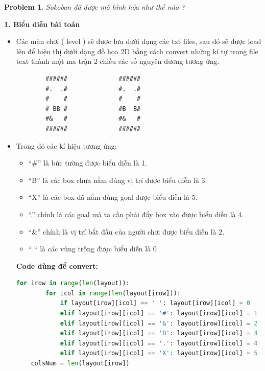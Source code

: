 \documentclass[12pt]{article}
\newtheorem{problem}{Problem}
\begin{document}
\begin{problem}
	Sokoban đã được mô hình hóa như thế nào ?
\end{problem}
\hspace{-1em}\textbf{1. Biểu diễn bài toán} 
\begin{itemize}
	\item Các màn chơi ( level ) sẽ được lưu dưới dạng các txt files, sau đó sẽ được load lên để hiện thị dưới dạng đồ họa 2D bằng cách convert những kí tự trong file text thành một ma trận 2 chiều các số nguyên dương tương ứng.
	\begin{lstlisting}
		######        		######   
		#.  .#        		#.  .#
		#    #        		#    #   
		# BB #        		#B  B#
		#&   #        		#&   #
		######        		######
	\end{lstlisting}
	\lstset{style=mystyle}

	\item Trong đó các kí hiệu tương ứng:
	\begin{itemize}
		\item “\#” là bức tường được biểu diễn là 1.
		\item “B” là các box chưa nằm đúng vị trí được biểu diễn là 3.
		\item “X” là các box đã nằm đúng goal được biểu diễn là 5.
		\item “.” chính là các goal mà ta cần phải đẩy box vào được biểu
		diễn là 4.
		\item “\&” chính là vị trí bắt đầu của người chơi được biểu diễn là 2.
		\item “ “  là các vùng trống được biểu diễn là 0
	\end{itemize}
	\noindent \hspace*{-1em}\textbf{
  Code dùng để convert:}
\begin{tcolorbox}[boxrule=0.5pt, colback=white]
\begin{lstlisting}[language=python, numbers=none, basicstyle=\ttfamily\footnotesize]
	for irow in range(len(layout)):
		for icol in range(len(layout[irow])):
			if layout[irow][icol] == ' ': layout[irow][icol] = 0   
			elif layout[irow][icol] == '#': layout[irow][icol] = 1 
			elif layout[irow][icol] == '&': layout[irow][icol] = 2 
			elif layout[irow][icol] == 'B': layout[irow][icol] = 3 
			elif layout[irow][icol] == '.': layout[irow][icol] = 4 
			elif layout[irow][icol] == 'X': layout[irow][icol] = 5 
	colsNum = len(layout[irow])
\end{lstlisting}
\end{tcolorbox}
\end{itemize}
\end{document}
